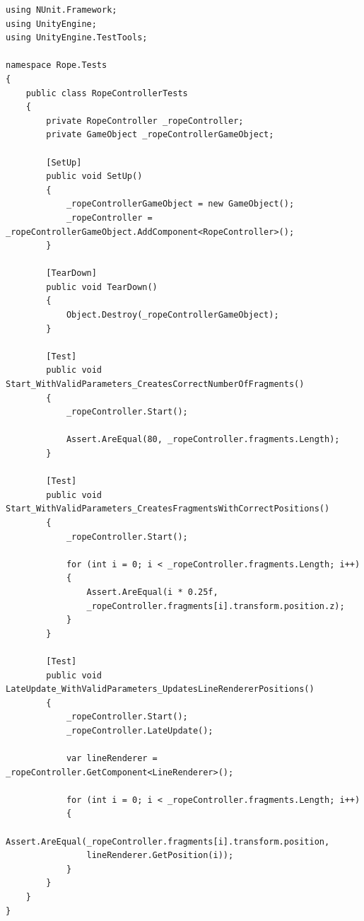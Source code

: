 \documentclass[12pt]{article}
\begin{document}
\begin{verbatim}
using NUnit.Framework;
using UnityEngine;
using UnityEngine.TestTools;

namespace Rope.Tests
{
    public class RopeControllerTests
    {
        private RopeController _ropeController;
        private GameObject _ropeControllerGameObject;

        [SetUp]
        public void SetUp()
        {
            _ropeControllerGameObject = new GameObject();
            _ropeController = _ropeControllerGameObject.AddComponent<RopeController>();
        }

        [TearDown]
        public void TearDown()
        {
            Object.Destroy(_ropeControllerGameObject);
        }

        [Test]
        public void Start_WithValidParameters_CreatesCorrectNumberOfFragments()
        {
            _ropeController.Start();

            Assert.AreEqual(80, _ropeController.fragments.Length);
        }

        [Test]
        public void Start_WithValidParameters_CreatesFragmentsWithCorrectPositions()
        {
            _ropeController.Start();

            for (int i = 0; i < _ropeController.fragments.Length; i++)
            {
                Assert.AreEqual(i * 0.25f, 
                _ropeController.fragments[i].transform.position.z);
            }
        }

        [Test]
        public void LateUpdate_WithValidParameters_UpdatesLineRendererPositions()
        {
            _ropeController.Start();
            _ropeController.LateUpdate();

            var lineRenderer = _ropeController.GetComponent<LineRenderer>();

            for (int i = 0; i < _ropeController.fragments.Length; i++)
            {
                Assert.AreEqual(_ropeController.fragments[i].transform.position, 
                lineRenderer.GetPosition(i));
            }
        }
    }
}
\end{verbatim}
\end{document}
